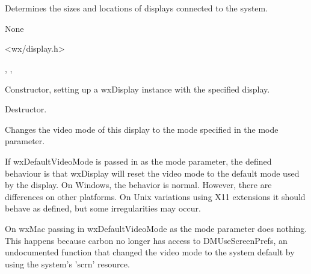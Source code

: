 \section{}\label{wxdisplay}

Determines the sizes and locations of displays connected to the system.


None


<wx/display.h>


, , 



\label{wxdisplayconstr}


Constructor, setting up a wxDisplay instance with the specified display.






Destructor.


\label{wxdisplaychangemode}


Changes the video mode of this display to the mode specified
in the mode parameter.

If wxDefaultVideoMode is passed in as the mode parameter,
the defined behaviour is that wxDisplay will reset the video
mode to the default mode used by the display.  On Windows, 
the behavior is normal.  However, there are differences on other
platforms. On Unix variations using X11 extensions it should
behave as defined, but some irregularities may occur.  

On wxMac passing in wxDefaultVideoMode as the mode
parameter does nothing.  This happens because carbon 
no longer has access to DMUseScreenPrefs, an undocumented
function that changed the video mode to the system
default by using the system's 'scrn' resource.


